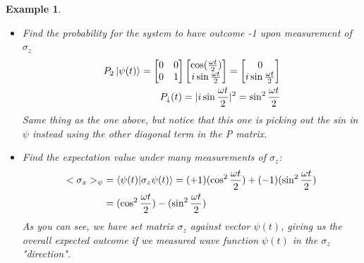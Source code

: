 \documentclass[12pt]{article}
\theoremstyle{plain}
\theoremstyle{nonumberplain}
\theoremstyle{plain}
\newtheorem{example}[lemma]{Example}
\theoremstyle{nonumberplain}
\newcommand\1{{\bf 1}}
\newcommand{\bmat}[1]{\begin{bmatrix*} #1 \end{bmatrix*}} %
\newcommand{\<}{\left\langle}
\renewcommand{\>}{\right\rangle}
\begin{document}
\begin{example}
\begin{itemize}
\begin{equation}
\begin{split}
P_2\ket{\psi(t)} = \bmat{1 &0\\ 0 &0}\bmat{\cos(\frac{\omega t}{2})\\ i\sin{\frac{\omega t}{2}}} = \bmat{\cos(\frac{\omega t}{2}) \\0}\\
P_\downarrow (t) = |\cos{\frac{\omega t}{2}}|^2 = \cos^2{\frac{\omega t}{2}}
\end{split}
\end{equation}
As you can see, we have picked off the cos out of $\psi$ and in order to compute the probability distribution of the wave, we square the final answer, this will look familiar to a probability and statistics class topic of expected values and distributions (because it is... Wow! never thought it would be useful again)  

\pagebreak
\item Find the probability for the system to have outcome -1 upon measurement of $\sigma_z$\\
\begin{equation}
\begin{split}
P_2\ket{\psi(t)} = \bmat{0 &0\\ 0 &1}\bmat{\cos(\frac{\omega t}{2})\\ i\sin{\frac{\omega t}{2}}} = \bmat{0 \\i\sin{\frac{\omega t}{2}}}\\
P_\downarrow (t) = |i\sin{\frac{\omega t}{2}}|^2 = \sin^2{\frac{\omega t}{2}}
\end{split}
\end{equation}
Same thing as the one above, but notice that this one is picking out the sin in $\psi$ instead using the other diagonal term in the P matrix.\\  
\item Find the expectation value under many measurements of $\sigma_z$:\\
\begin{equation}
\begin{split}
<\sigma_x>_\psi &= \braket{\psi(t)|\sigma_z\psi(t)} = (+1)(\cos^2{\frac{\omega t}{2}}) +  (-1)(\sin^2{\frac{\omega t}{2}})\\
&= (\cos^2{\frac{\omega t}{2}}) - (\sin^2{\frac{\omega t}{2}})
\end{split}
\end{equation}
As you can see, we have set matrix $\sigma_z$ against vector $\psi(t)$, giving us the overall expected outcome if we measured wave function $\psi(t)$ in the $\sigma_z$ "direction". 
\end{itemize}
\end{example}
\end{document}
